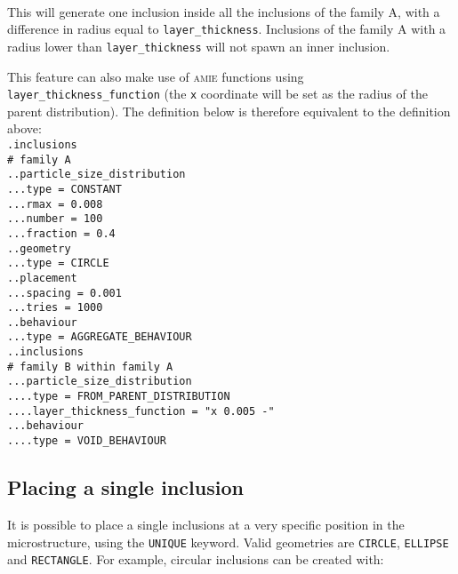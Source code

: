 \documentclass[10pt]{article}
\begin{document}
\paragraph{}This will generate one inclusion inside all the inclusions of the family A, with a difference in radius equal to \verb+layer_thickness+. Inclusions of the family A with a radius lower than \verb+layer_thickness+ will not spawn an inner inclusion.

This feature can also make use of \textsc{amie} functions using \verb+layer_thickness_function+ (the \verb+x+ coordinate will be set as the radius of the parent distribution). The definition below is therefore equivalent to the definition above:\\

\noindent \verb+.inclusions+\\
\verb+# family A+\\
\verb+..particle_size_distribution+\\
\verb+...type = CONSTANT+\\
\verb+...rmax = 0.008+\\
\verb+...number = 100+\\
\verb+...fraction = 0.4+\\
\verb+..geometry+\\
\verb+...type = CIRCLE+\\
\verb+..placement+\\
\verb+...spacing = 0.001+\\
\verb+...tries = 1000+\\
\verb+..behaviour+\\
\verb+...type = AGGREGATE_BEHAVIOUR+\\
\verb+..inclusions+\\
\verb+# family B within family A+\\
\verb+...particle_size_distribution+\\
\verb+....type = FROM_PARENT_DISTRIBUTION+\\
\verb+....layer_thickness_function = "x 0.005 -"+\\
\verb+...behaviour+\\
\verb+....type = VOID_BEHAVIOUR+

\subsection{Placing a single inclusion}

It is possible to place a single inclusions at a very specific position in the microstructure, using the \verb+UNIQUE+ keyword. Valid geometries are \verb+CIRCLE+, \verb+ELLIPSE+ and \verb+RECTANGLE+. For example, circular inclusions can be created with:
\end{document}
